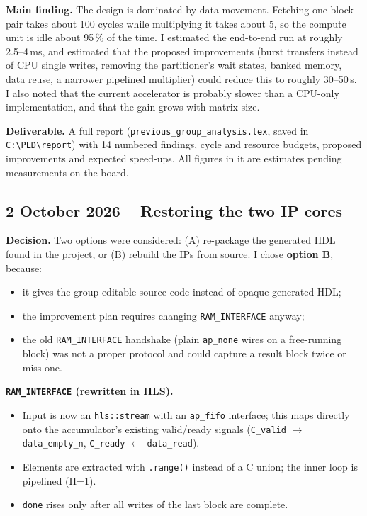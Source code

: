 \documentclass[11pt,a4paper]{article}
\newcommand{\code}[1]{\texttt{#1}}
\begin{document}
\textbf{Main finding.} The design is dominated by data movement. Fetching one block pair takes about 100 cycles while multiplying it takes about 5, so the compute unit is idle about 95\,\% of the time. I estimated the end-to-end run at roughly 2.5--4\,ms, and estimated that the proposed improvements (burst transfers instead of CPU single writes, removing the partitioner's wait states, banked memory, data reuse, a narrower pipelined multiplier) could reduce this to roughly 30--50\,\textmu s. I also noted that the current accelerator is probably slower than a CPU-only implementation, and that the gain grows with matrix size.

\textbf{Deliverable.} A full report (\code{previous\_group\_analysis.tex}, saved in \code{C:\textbackslash PLD\textbackslash report}) with 14 numbered findings, cycle and resource budgets, proposed improvements and expected speed-ups. All figures in it are estimates pending measurements on the board.

\subsection{2 October 2026 -- Restoring the two IP cores}
\textbf{Decision.} Two options were considered: (A) re-package the generated HDL found in the project, or (B) rebuild the IPs from source. I chose \textbf{option B}, because:
\begin{itemize}[noitemsep]
  \item it gives the group editable source code instead of opaque generated HDL;
  \item the improvement plan requires changing \code{RAM\_INTERFACE} anyway;
  \item the old \code{RAM\_INTERFACE} handshake (plain \code{ap\_none} wires on a free-running block) was not a proper protocol and could capture a result block twice or miss one.
\end{itemize}

\textbf{\code{RAM\_INTERFACE} (rewritten in HLS).}
\begin{itemize}[noitemsep]
  \item Input is now an \code{hls::stream} with an \code{ap\_fifo} interface; this maps directly onto the accumulator's existing valid/ready signals (\code{C\_valid} $\rightarrow$ \code{data\_empty\_n}, \code{C\_ready} $\leftarrow$ \code{data\_read}).
  \item Elements are extracted with \code{.range()} instead of a C union; the inner loop is pipelined (II=1).
  \item \code{done} rises only after all writes of the last block are complete.
\end{itemize}
\end{document}
